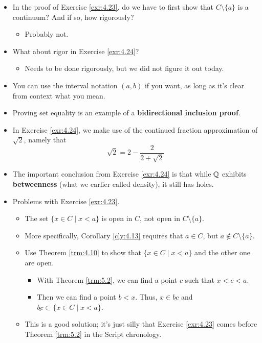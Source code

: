 \documentclass[titlepage]{report}
\begin{document}
\begin{itemize}
\begin{itemize}
    \end{itemize}
    \item {}In the proof of Exercise \ref{exr:4.23}, do we have to first show that $C\setminus\{a\}$ is a continuum? And if so, how rigorously?
    \begin{itemize}
        \item Probably not.
    \end{itemize}
    \item What about rigor in Exercise \ref{exr:4.24}?
    \begin{itemize}
        \item Needs to be done rigorously, but we did not figure it out today.
    \end{itemize}
    \item You can use the interval notation $(a,b)$ if you want, as long as it's clear from context what you mean.
    \item {}Proving set equality is an example of a \textbf{bidirectional inclusion proof}.
    \item In Exercise \ref{exr:4.24}, we make use of the continued fraction approximation of $\sqrt{2}$, namely that
    \begin{equation*}
        \sqrt{2} = 2-\frac{2}{2+\sqrt{2}}
    \end{equation*}
    \item The important conclusion from Exercise \ref{exr:4.24} is that while $\mathbb{Q}$ exhibits \textbf{betweenness} (what we earlier called density), it still has holes.
    \item {}Problems with Exercise \ref{exr:4.23}.
    \begin{itemize}
        \item The set $\{x\in C\mid x<a\}$ is open in $C$, not open in $C\setminus\{a\}$.
        \item More specifically, Corollary \ref{cly:4.13} requires that $a\in C$, but $a\notin C\setminus\{a\}$.
        \item Use Theorem \ref{trm:4.10} to show that $\{x\in C\mid x<a\}$ and the other one are open.
        \begin{itemize}
            \item With Theorem \ref{trm:5.2}, we can find a point $c$ such that $x<c<a$.
            \item Then we can find a point $b<x$. Thus, $x\in\underline{bc}$ and $\underline{bc}\subset\{x\in C\mid x<a\}$.
        \end{itemize}
        \item This is a good solution; it's just silly that Exercise \ref{exr:4.23} comes before Theorem \ref{trm:5.2} in the Script chronology.
    \end{itemize}
\end{itemize}
\end{document}
